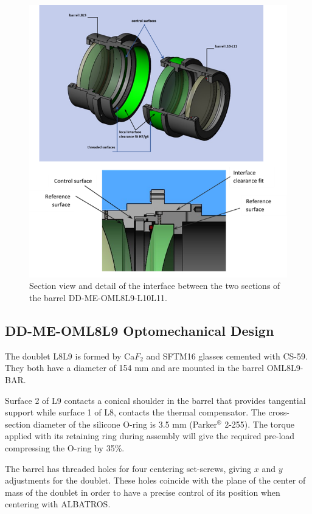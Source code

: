 \documentclass{report}
\begin{document}
\begin{figure}
\begin{center}
\includegraphics[width=0.9\linewidth]{figures/DD-OML8L9L10L11_wdetail.png}
\end{center}
\caption{Section view and detail of the interface between the two sections of the barrel DD-ME-OML8L9-L10L11.}
\label{figure:WOB-L8L11-DET}
\end{figure}

\subsection{DD-ME-OML8L9 Optomechanical Design}

The doublet L8L9 is formed by Ca$F_2$ and SFTM16 glasses cemented with CS-59. They both have a diameter of 154 mm and are mounted in the barrel OML8L9-BAR.

Surface 2 of L9 contacts a conical shoulder in the barrel that provides tangential support while surface 1 of L8, contacts the thermal compensator. The cross-section diameter of the silicone O-ring is 3.5 mm (Parker${}^\circledR$ 2-255). The torque applied with its retaining ring during assembly will give the required pre-load compressing the O-ring by 35\%.

The barrel has threaded holes for four centering set-screws, giving $x$ and $y$ adjustments for the doublet. These holes coincide with the plane of the center of mass of the doublet in order to have a precise control of its position when centering with ALBATROS.
\end{document}
